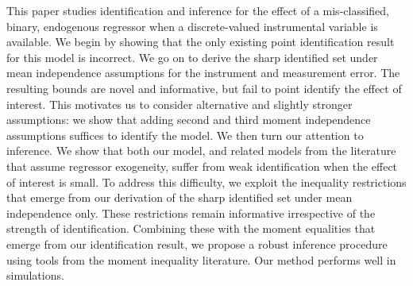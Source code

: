This paper studies identification and inference for the effect of a mis-classified, binary, endogenous regressor when a discrete-valued instrumental variable is available. 
We begin by showing that the only existing point identification result for this model is incorrect. 
We go on to derive the sharp identified set under mean independence assumptions for the instrument and measurement error.
The resulting bounds are novel and informative, but fail to point identify the effect of interest.
This motivates us to consider alternative and slightly stronger assumptions: we show that adding second and third moment independence assumptions suffices to identify the model.
We then turn our attention to inference.
We show that both our model, and related models from the literature that assume regressor exogeneity, suffer from weak identification when the effect of interest is small.
To address this difficulty, we exploit the inequality restrictions that emerge from our derivation of the sharp identified set under mean independence only.
These restrictions remain informative irrespective of the strength of identification.
Combining these with the moment equalities that emerge from our identification result, we propose a robust inference procedure using tools from the moment inequality literature.
Our method performs well in simulations.
